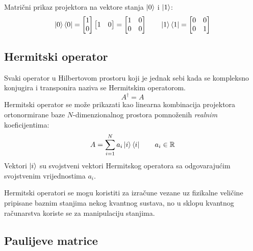 Matrični prikaz projektora na vektore stanja $\ket{0}$ i $\ket{1}$:
\[
\ket{0}\bra{0} =
\begin{bmatrix}
1 \\ 0
\end{bmatrix}
\begin{bmatrix}
1 & 0
\end{bmatrix}
=
\begin{bmatrix}
1 & 0 \\ 0 & 0
\end{bmatrix}
\qquad
\ket{1}\bra{1} = 
\begin{bmatrix}
0 & 0 \\ 0 & 1
\end{bmatrix}
\]

\subsection{Hermitski operator}

Svaki operator u Hilbertovom prostoru koji je jednak sebi kada se kompleksno konjugira i transponira naziva se Hermitskim operatorom.
\[
A^\dagger = A
\]
Hermitski operator se može prikazati kao linearna kombinacija projektora ortonormirane baze $N$-dimenzionalnog prostora pomnoženih \emph{realnim} koeficijentima:
\[
A = \sum_{i = 1}^N a_i\ket{i}\bra{i}
\qquad
a_i \in \mathbb{R}
\]
Vektori $\ket{i}$ su svojstveni vektori Hermitskog operatora sa odgovarajućim svojstvenim vrijednostima $a_i$.

Hermitski operatori se mogu koristiti za izračune vezane uz fizikalne veličine pripisane baznim stanjima nekog kvantnog sustava, no u sklopu kvantnog računarstva koriste se za manipulaciju stanjima.

\subsection{Paulijeve matrice}

